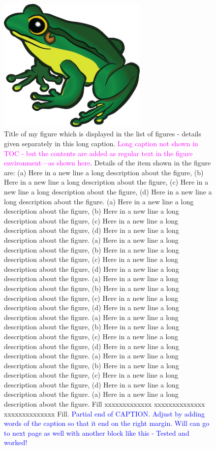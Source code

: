 \documentclass[phd]{ndsu-thesis-2022}
\begin{document}
\begin{figure}[p]%
\setlength\belowcaptionskip{-20pt}%
\begin{center}
\includegraphics[width=0.65\textwidth]{frog.jpg}
\end{center}
\caption[Title of my figure which is displayed in the list of figures - details given separately in this long caption.]{Title of my figure which is displayed in the list of figures - details given separately in this long caption. \textcolor{magenta}{Long caption not shown in TOC - but the contents are added as regular text in the figure environment---as shown here}. Details of the item shown in the figure are: (a) Here in a new line a long description about the figure, (b) Here in a new line a long description about the figure, (c) Here in a new line a long description about the figure, (d) Here in a new line a long description about the figure. (a) Here in a new line a long description about the figure, (b) Here in a new line a long description about the figure, (c) Here in a new line a long description about the figure, (d) Here in a new line a long description about the figure. (a) Here in a new line a long description about the figure, (b) Here in a new line a long description about the figure, (c) Here in a new line a long description about the figure, (d) Here in a new line a long description about the figure. (a) Here in a new line a long description about the figure, (b) Here in a new line a long description about the figure, (c) Here in a new line a long description about the figure, (d) Here in a new line a long description about the figure. (a) Here in a new line a long description about the figure, (b) Here in a new line a long description about the figure, (c) Here in a new line a long description about the figure, (d) Here in a new line a long description about the figure. (a) Here in a new line a long description about the figure, (b) Here in a new line a long description about the figure, (c) Here in a new line a long description about the figure, (d) Here in a new line a long description about the figure. (a) Here in a new line a long description about the figure.  Fill xxxxxxxxxxxxx xxxxxxxxxxxxxx xxxxxxxxxxxxxx Fill. \textcolor{blue}{Partial end of CAPTION. Adjust by adding words of the caption so that it end on the right margin. Will can go to next page as well with another block like this - Tested and worked!}}
\label{figlongcaption}
\end{figure}
\end{document}
